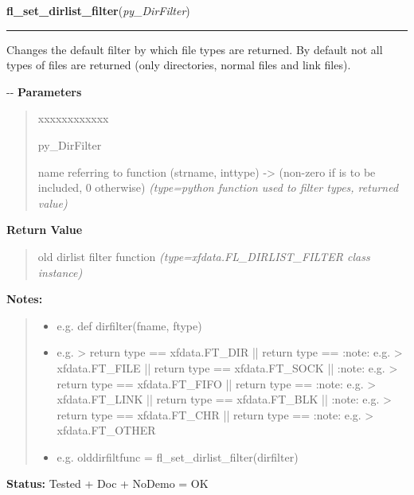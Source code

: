 \hspace{.8\funcindent}\begin{boxedminipage}{\funcwidth}

    \raggedright \textbf{fl\_set\_dirlist\_filter}(\textit{py\_DirFilter})

    \vspace{-1.5ex}

    \rule{\textwidth}{0.5\fboxrule}
\setlength{\parskip}{2ex}

Changes the default filter by which file types are returned.
By default not all types of files are returned (only directories,
normal files and link files).

-{}-
\setlength{\parskip}{1ex}
      \textbf{Parameters}
      \vspace{-1ex}

      \begin{quote}
        \begin{Ventry}{xxxxxxxxxxxx}

          \item[py\_DirFilter]


name referring to function (strname, inttype) -> (non-zero if is to
be included, 0 otherwise)
            {\it (type=python function used to filter types, returned value)}

        \end{Ventry}

      \end{quote}

      \textbf{Return Value}
    \vspace{-1ex}

      \begin{quote}

old dirlist filter function
      {\it (type=xfdata.FL\_DIRLIST\_FILTER class instance)}

      \end{quote}

\textbf{Notes:}
\begin{quote}
  \begin{itemize}

  \item
    \setlength{\parskip}{0.6ex}

e.g. def dirfilter(fname, ftype)


  \item 
e.g. > return type == xfdata.FT\_DIR || return type ==     :note: e.g. > xfdata.FT\_FILE || return type == xfdata.FT\_SOCK ||     :note: e.g. > return type == xfdata.FT\_FIFO || return type ==     :note: e.g. > xfdata.FT\_LINK || return type == xfdata.FT\_BLK ||     :note: e.g. > return type == xfdata.FT\_CHR || return type ==     :note: e.g. > xfdata.FT\_OTHER


  \item 
e.g. olddirfiltfunc = fl\_set\_dirlist\_filter(dirfilter)


\end{itemize}

\end{quote}

\textbf{Status:} 
Tested + Doc + NoDemo = OK


    \end{boxedminipage}

